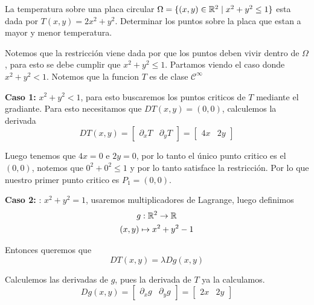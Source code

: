 \documentclass[a4paper,oneside,10.5pt]{article}
\begin{document}
\begin{prob}
    La temperatura sobre una placa circular $\Omega = \{(x, y) \in \mathbb{R}^2 \; | \; x^2 + y^2 \leq 1\}$ esta dada por $T(x, y) = 2x^2 + y^2$. Determinar los puntos sobre la placa que estan a mayor y menor temperatura.
\end{prob}

\begin{sol}
    Notemos que la restricción viene dada por que los puntos deben vivir dentro de $\Omega$, para esto se debe cumplir que $x^2 + y^2 \leq 1$. Partamos viendo el caso donde $x^2 + y^2 < 1$. Notemos que la funcion $T$ es de clase $\mathcal{C}^\infty$

    \textbf{Caso 1: } $x^2 + y^2 < 1$, para esto buscaremos los puntos criticos de $T$ mediante el gradiante. Para esto necesitamos que $DT(x, y) = (0,0)$, calculemos la derivada
    \begin{equation*}
        DT(x, y) = \begin{bmatrix}
            \partial_x T & \partial_y T
        \end{bmatrix} = \begin{bmatrix}
            4x & 2y
        \end{bmatrix}
    \end{equation*}

    Luego tenemos que $4x = 0$ e $2y = 0$, por lo tanto el único punto critico es el $(0, 0)$, notemos que $0^2 + 0^2 \leq 1$ y por lo tanto satisface la restricción. Por lo que nuestro primer punto critico es $P_1 = (0, 0)$.

    \textbf{Caso 2: }: $x^2 + y^2 = 1$, usaremos multiplicadores de Lagrange, luego definimos
    \begin{gather*}
        g: \mathbb{R}^2 \to \mathbb{R}\\
        (x, y) \mapsto x^2 + y^2 - 1
    \end{gather*}

    Entonces queremos que
    \begin{equation*}
        DT(x, y) = \lambda Dg(x, y)
    \end{equation*}

    Calculemos las derivadas de $g$, pues la derivada de $T$ ya la calculamos.
    \begin{equation*}
        Dg(x, y) = \begin{bmatrix}
            \partial_x g & \partial_y g
        \end{bmatrix} = \begin{bmatrix}
            2x & 2y
        \end{bmatrix}
    \end{equation*}


\end{sol}
\end{document}
